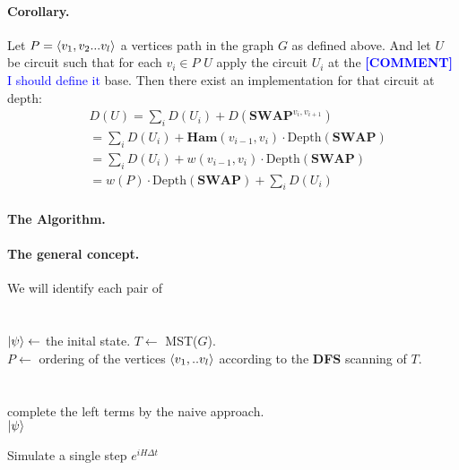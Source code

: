 \documentclass{article}
\newcommand{\commentt}[1]{\textcolor{blue}{ \textbf{[COMMENT]} #1}}
\newcommand{\ctt}[1]{\commentt{#1}}
\begin{document}
\begin{multicols*}{2}
\paragraph{Corollary.} Let \(P = \braket{v_{1}, v_{2} ... v_{l}}\) a vertices path in the graph \(G\) as defined above. And let \(U\) be circuit such that for each \(v_{i} \in P \) \(U\) apply the circuit \(U_{i}\) at the \ctt{I should define it} base. Then there exist an implementation for that circuit at depth:
\begin{equation*}
    \begin{split}
        & D(U) = \sum_{i}{D\left(U_{i}\right)+D\left(\textbf{SWAP}^{v_{i},v_{i+1}}\right)}\\
        & = \sum_{i}{D\left(U_{i}\right) + \textbf{Ham}(v_{i-1},v_{i}) \cdot\text{Depth}\left(\textbf{SWAP}\right)} \\ 
        & = \sum_{i}{D\left(U_{i}\right) + w(v_{i-1},v_{i}) \cdot\text{Depth}\left(\textbf{SWAP}\right)} \\
        & = w\left(P\right)\cdot\text{Depth}\left(\textbf{SWAP}\right) +   \sum_{i}{D\left(U_{i}\right) }  
    \end{split}
\end{equation*}

\paragraph{The Algorithm.}

\paragraph{The general concept.} We will identify each pair of  


\paragraph{}

\begin{algorithm}[H]
\SetAlgoLined
\ \\ 
\( \ket{\psi} \leftarrow \) the inital state.
 \(T  \leftarrow\) MST(\(G\)). \\
 \(P \leftarrow \) ordering of the vertices \( \braket{v_{1} , .. v_{l}}\) according to the \textbf{DFS} scanning of \(T\). \\
 \ \\ 
 \ \\
 complete the left terms by the naive approach. \\
 \Return \( \ket{\psi} \)
 \caption{Simulate a single step \(e^{iH\Delta t}\)}
\end{algorithm}



\end{multicols*}
\end{document}
